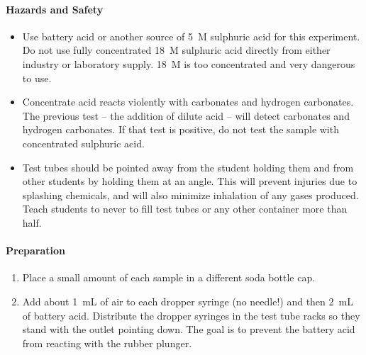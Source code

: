 \paragraph{Hazards and Safety}
\begin{itemize}
\item{Use battery acid or another source of 5~M sulphuric acid for this experiment. Do not use fully concentrated 18~M sulphuric acid directly from either industry or laboratory supply. 18~M is too concentrated and very dangerous to use.}
\item{Concentrate acid reacts violently with carbonates and hydrogen carbonates. The previous test -- the addition of dilute acid -- will detect carbonates and hydrogen carbonates. If that test is positive, do not test the sample with concentrated sulphuric acid.}
\item Test tubes should be pointed away from the student holding them and
from other students by holding them at an angle. This will prevent
injuries due to splashing chemicals, and will also minimize inhalation
of any gases produced. Teach students to never to fill test tubes or
any other container more than half.
\end{itemize}

\paragraph{Preparation}
\begin{enumerate}
\item{Place a small amount of each sample in a different soda bottle cap.}
\item{Add about 1~mL of air to each dropper syringe (no needle!) and then 2~mL of battery acid. Distribute the dropper syringes in the test tube racks so they stand with the outlet pointing down. The goal is to prevent the battery acid from reacting with the rubber plunger.}
\end{enumerate}

